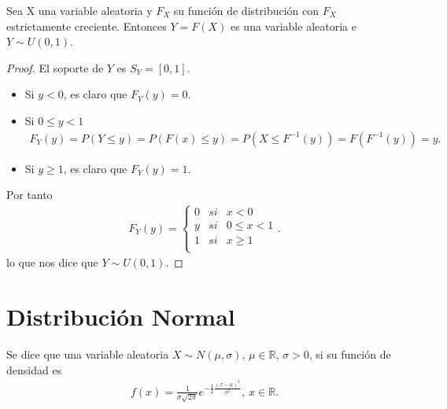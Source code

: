 \begin{prop}
    Sea X una variable aleatoria y $F_X$ su función de distribución con $F_X$ estrictamente creciente. Entonces $Y = F(X)$ es una variable aleatoria e $Y \sim U(0,1)$.
\end{prop}

\begin{proof}
    El soporte de $Y$ es $S_Y = [0,1]$.
    \begin{itemize}
        \item Si $y < 0$, es claro que $F_Y(y) = 0$.
        \item Si $0 \leq y < 1$
              \begin{align*}
                  F_Y(y) = P(Y \leq y) = P(F(x) \leq y) = P(X \leq F^{-1}(y)) = F(F^{-1}(y)) = y.
              \end{align*}
        \item Si $y \ge 1$, es claro que $F_Y(y) = 1$.
    \end{itemize}
    Por tanto
    \begin{align*}
        F_Y(y) = \left\{ \begin{array}{lcc}
                             0 & si & x < 0        \\
                             y & si & 0 \leq x < 1 \\
                             1 & si & x \ge 1      \\
                         \end{array}
        \right. .
    \end{align*}
    lo que nos dice que $Y \sim U(0,1)$.
\end{proof}

\section{Distribución Normal}

\begin{defi}
    Se dice que una variable aleatoria $X \sim N(\mu, \sigma)$, $\mu \in \mathbb{R}$, $\sigma > 0$, si su función de densidad es
    \begin{align*}
        f(x) = \frac{1}{\sigma \sqrt{2\pi}}e^{-\frac{1}{2}\frac{(x - \mu)^2}{\sigma^2}}, \ x \in \mathbb{R}.
    \end{align*}
\end{defi}


